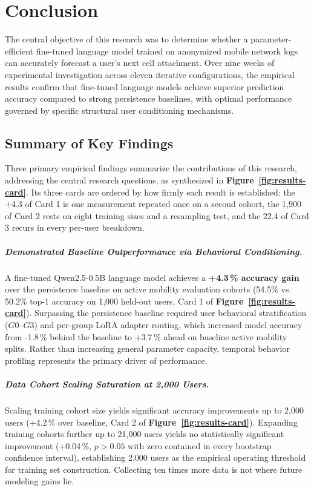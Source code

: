 \chapter{Conclusion}
\label{ch:conclusion}

The central objective of this research was to determine whether a parameter-efficient fine-tuned language model trained on anonymized mobile network logs can accurately forecast a user's next cell attachment. Over nine weeks of experimental investigation across eleven iterative configurations, the empirical results confirm that fine-tuned language models achieve superior prediction accuracy compared to strong persistence baselines, with optimal performance governed by specific structural user conditioning mechanisms.

\section{Summary of Key Findings}

Three primary empirical findings summarize the contributions of this research, addressing the central research questions, as synthesized in \textbf{Figure~\ref{fig:results-card}}. Its three cards are ordered by how firmly each result is established: the +4.3 of Card 1 is one measurement repeated once on a second cohort, the 1,900 of Card 2 rests on eight training sizes and a resampling test, and the 22.4 of Card 3 recurs in every per-user breakdown.



\paragraph{Demonstrated Baseline Outperformance via Behavioral Conditioning.} A fine-tuned Qwen2.5-0.5B language model achieves a \textbf{+4.3\,\% accuracy gain} over the persistence baseline on active mobility evaluation cohorts (54.5\% vs. 50.2\% top-1 accuracy on 1,000 held-out users, Card 1 of \textbf{Figure~\ref{fig:results-card}}). Surpassing the persistence baseline required user behavioral stratification ($G0$--$G3$) and per-group LoRA adapter routing, which increased model accuracy from -1.8\,\% behind the baseline to +3.7\,\% ahead on baseline active mobility splits. Rather than increasing general parameter capacity, temporal behavior profiling represents the primary driver of performance.

\paragraph{Data Cohort Scaling Saturation at 2,000 Users.} Scaling training cohort size yields significant accuracy improvements up to 2,000 users (+4.2\,\% over baseline, Card 2 of \textbf{Figure~\ref{fig:results-card}}). Expanding training cohorts further up to 21,000 users yields no statistically significant improvement (+0.04\,\%, $p > 0.05$ with zero contained in every bootstrap confidence interval), establishing 2,000 users as the empirical operating threshold for training set construction. Collecting ten times more data is not where future modeling gains lie.

